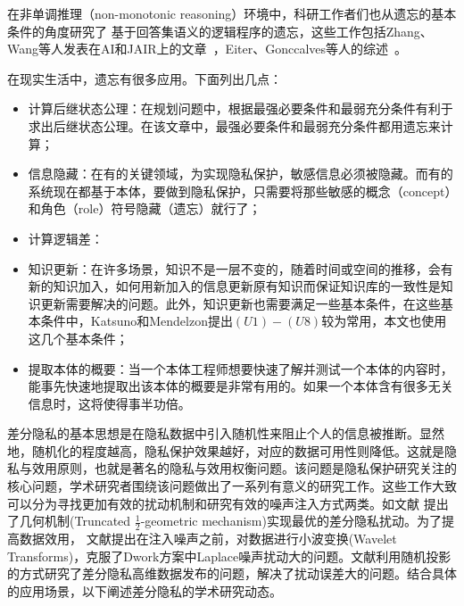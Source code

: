 
在非单调推理（non-monotonic reasoning）环境中，科研工作者们也从遗忘的基本条件的角度研究了
基于回答集语义的逻辑程序的遗忘，这些工作包括Zhang、Wang等人发表在AI和JAIR上的文章~\cite{DBLP:Zhang:AIJ2006,DBLP:journals/ai/EiterW08,Wong:PhD:Thesis,DBLP:journals/jair/WangZZZ14,wang2013forgetting,DBLP:journals/jair/Delgrande17,gonccalves2020limits}，Eiter、Gonccalves等人的综述~\cite{eiter2019brief,gonccalves2021forgetting}。


在现实生活中，遗忘有很多应用。下面列出几点：
\begin{itemize}
	\item 计算后继状态公理：在规划问题中，根据最强必要条件和最弱充分条件有利于求出后继状态公理\cite{DBLP:journals/jair/Lin03}。在该文章中，最强必要条件和最弱充分条件都用遗忘来计算；
	\item 信息隐藏：在有的关键领域，为实现隐私保护，敏感信息必须被隐藏。而有的系统现在都基于本体，要做到隐私保护，只需要将那些敏感的概念（concept）和角色（role）符号隐藏（遗忘）就行了；
	\item 计算逻辑差：
	\item 知识更新：在许多场景，知识不是一层不变的，随着时间或空间的推移，会有新的知识加入，如何用新加入的信息更新原有知识而保证知识库的一致性是知识更新需要解决的问题。此外，知识更新也需要满足一些基本条件，在这些基本条件中，Katsuno和Mendelzon提出$(U1)-(U8)$较为常用，本文也使用这几个基本条件；
	\item 提取本体的概要：当一个本体工程师想要快速了解并测试一个本体的内容时，能事先快速地提取出该本体的概要是非常有用的。如果一个本体含有很多无关信息时，这将使得事半功倍。
\end{itemize}




差分隐私的基本思想是在隐私数据中引入随机性来阻止个人的信息被推断。显然地，随机化的程度越高，隐私保护效果越好，对应的数据可用性则降低。这就是隐私与效用原则\cite{sankar2013utility}，也就是著名的隐私与效用权衡问题\cite{basciftci2016on,alvim2011differential}。该问题是隐私保护研究关注的核心问题，学术研究者围绕该问题做出了一系列有意义的研究工作。这些工作大致可以分为寻找更加有效的扰动机制\cite{ghosh2012universally,wang2016on,alvim2011differential}和研究有效的噪声注入方式\cite{geng2016the}两类。如文献 提出了几何机制(Truncated $\frac{1}{2}$-geometric mechanism)实现最优的差分隐私扰动。为了提高数据效用， 文献提出在注入噪声之前，对数据进行小波变换(Wavelet Transforms)，克服了Dwork方案中Laplace噪声扰动大的问题。文献利用随机投影的方式研究了差分隐私高维数据发布的问题，解决了扰动误差大的问题。结合具体的应用场景，以下阐述差分隐私的学术研究动态。



